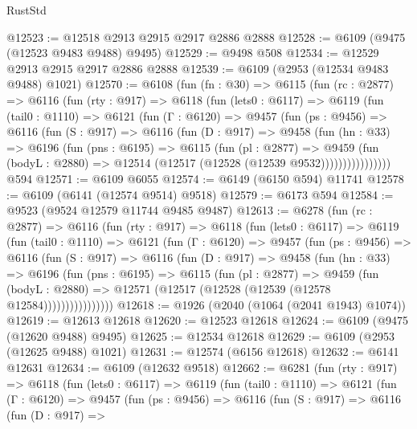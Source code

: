 \begin{lexlean}{RustStd}
\begin{coremodule}
@12523 := @12518 @2913 @2915 @2917 @2886 @2888
@12528 := @6109 (@9475 (@12523 @9483 @9488) @9495)
@12529 := @9498 @508
@12534 := @12529 @2913 @2915 @2917 @2886 @2888
@12539 := @6109 (@2953 (@12534 @9483 @9488) @1021)
@12570 := @6108
    (fun (fn : @30) =>
    @6115
      (fun (rc : @2877) =>
      @6116
        (fun (rty : @917) =>
        @6118
          (fun (lets0 : @6117) =>
          @6119
            (fun (tail0 : @1110) =>
            @6121
              (fun (Γ : @6120) =>
              @9457
                (fun (ps : @9456) =>
                @6116
                  (fun (S : @917) =>
                  @6116
                    (fun (D : @917) =>
                    @9458
                      (fun (hn : @33) =>
                      @6196
                        (fun (pns : @6195) =>
                        @6115
                          (fun (pl : @2877) =>
                          @9459
                            (fun (bodyL : @2880) =>
                            @12514 (@12517 (@12528 (@12539 @9532))))))))))))))))
    @594
@12571 := @6109 @6055
@12574 := @6149 (@6150 @594) @11741
@12578 := @6109 (@6141 (@12574 @9514) @9518)
@12579 := @6173 @594
@12584 := @9523 (@9524 @12579 @11744 @9485 @9487)
@12613 := @6278
    (fun (rc : @2877) =>
    @6116
      (fun (rty : @917) =>
      @6118
        (fun (lets0 : @6117) =>
        @6119
          (fun (tail0 : @1110) =>
          @6121
            (fun (Γ : @6120) =>
            @9457
              (fun (ps : @9456) =>
              @6116
                (fun (S : @917) =>
                @6116
                  (fun (D : @917) =>
                  @9458
                    (fun (hn : @33) =>
                    @6196
                      (fun (pns : @6195) =>
                      @6115
                        (fun (pl : @2877) =>
                        @9459
                          (fun (bodyL : @2880) =>
                          @12571 (@12517 (@12528 (@12539 (@12578 @12584))))))))))))))))
@12618 := @1926 (@2040 (@1064 (@2041 @1943) @1074))
@12619 := @12613 @12618
@12620 := @12523 @12618
@12624 := @6109 (@9475 (@12620 @9488) @9495)
@12625 := @12534 @12618
@12629 := @6109 (@2953 (@12625 @9488) @1021)
@12631 := @12574 (@6156 @12618)
@12632 := @6141 @12631
@12634 := @6109 (@12632 @9518)
@12662 := @6281
    (fun (rty : @917) =>
    @6118
      (fun (lets0 : @6117) =>
      @6119
        (fun (tail0 : @1110) =>
        @6121
          (fun (Γ : @6120) =>
          @9457
            (fun (ps : @9456) =>
            @6116
              (fun (S : @917) =>
              @6116
                (fun (D : @917) =>

\end{coremodule}
\end{lexlean}
